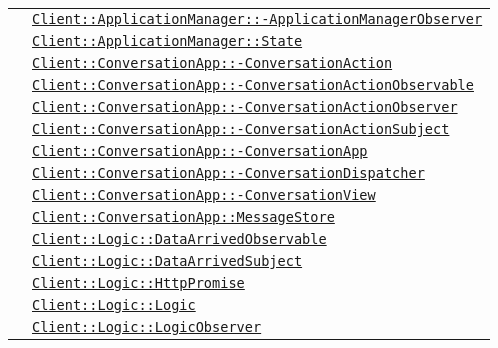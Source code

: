 \begin{longtable}{|>{\centering}m{3cm}|m{10cm}<{\centering}|}
& \hyperref[Client::ApplicationManager::ApplicationManagerObserver]{\texttt{Client::ApplicationManager::-\linebreak ApplicationManagerObserver}}\\
& \hyperref[Client::ApplicationManager::State]{\texttt{Client::ApplicationManager::State}}\\
& \hyperref[Client::ConversationApp::ConversationAction]{\texttt{Client::ConversationApp::-\linebreak ConversationAction}}\\
& \hyperref[Client::ConversationApp::ConversationActionObservable]{\texttt{Client::ConversationApp::-\linebreak ConversationActionObservable}}\\
& \hyperref[Client::ConversationApp::ConversationActionObserver]{\texttt{Client::ConversationApp::-\linebreak ConversationActionObserver}}\\
& \hyperref[Client::ConversationApp::ConversationActionSubject]{\texttt{Client::ConversationApp::-\linebreak ConversationActionSubject}}\\
& \hyperref[Client::ConversationApp::ConversationApp]{\texttt{Client::ConversationApp::-\linebreak ConversationApp}}\\
& \hyperref[Client::ConversationApp::ConversationDispatcher]{\texttt{Client::ConversationApp::-\linebreak ConversationDispatcher}}\\
& \hyperref[Client::ConversationApp::ConversationView]{\texttt{Client::ConversationApp::-\linebreak ConversationView}}\\
& \hyperref[Client::ConversationApp::MessageStore]{\texttt{Client::ConversationApp::MessageStore}}\\
& \hyperref[Client::Logic::DataArrivedObservable]{\texttt{Client::Logic::DataArrivedObservable}}\\
& \hyperref[Client::Logic::DataArrivedSubject]{\texttt{Client::Logic::DataArrivedSubject}}\\
& \hyperref[Client::Logic::HttpPromise]{\texttt{Client::Logic::HttpPromise}}\\
& \hyperref[Client::Logic::Logic]{\texttt{Client::Logic::Logic}}\\
& \hyperref[Client::Logic::LogicObserver]{\texttt{Client::Logic::LogicObserver}}\\

\end{longtable}
